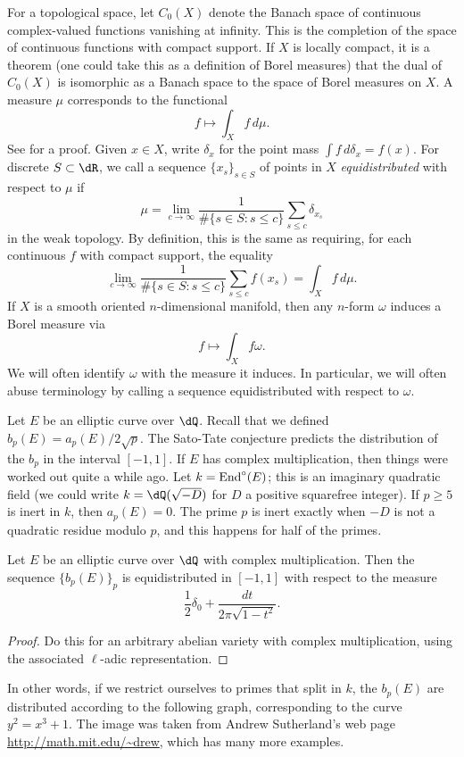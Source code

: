 For a topological space, let $C_0(X)$ denote the Banach space of continuous 
complex-valued functions vanishing at infinity. This is the completion of the 
space of continuous functions with compact support. If $X$ is locally compact, 
it is a theorem (one could take this as a definition of Borel measures) that 
the dual of $C_0(X)$ is isomorphic as a Banach space to the space of Borel 
measures on $X$. A measure $\mu$ corresponds to the functional 
\[
  f\mapsto  \int_X f\, d\mu \text{.}
\]
See \cite[6.19]{ru87} for a proof. Given $x\in X$, write $\delta_x$ for the 
point mass $\int f\,d\delta_x = f(x)$. For discrete $S\subset \dR$, we call a 
sequence $\{x_s\}_{s\in S}$ of points in $X$ \emph{equidistributed} with 
respect to $\mu$ if 
\[
  \mu = \lim_{c \to \infty} \frac{1}{\# \{s\in S:s\leqslant c\}} \sum_{s\leqslant c} \delta_{x_s} 
\]
in the weak topology. By definition, this is the same as requiring, for each 
continuous $f$ with compact support, the equality 
\[
   \lim_{c \to \infty} \frac{1}{\# \{s\in S:s\leqslant c\}} \sum_{s\leqslant c} f(x_s)  = \int_X f\, d\mu\text{.}
\]
If $X$ is a smooth oriented $n$-dimensional manifold, then any $n$-form 
$\omega$ induces a Borel measure via 
\[
  f\mapsto \int_X f\omega \text{.}
\]
We will often identify $\omega$ with the measure it induces. In particular, we 
will often abuse terminology by calling a sequence equidistributed with 
respect to $\omega$. 

Let $E$ be an elliptic curve over $\dQ$. Recall that we defined 
$b_p(E) = a_p(E) / 2\sqrt p$. The Sato-Tate conjecture predicts the 
distribution of the $b_p$ in the interval $[-1,1]$. If $E$ has complex 
multiplication, then things were worked out quite a while ago. Let 
$k=\operatorname{End}^\circ(E)$; this is an imaginary quadratic field (we could write 
$k=\dQ(\sqrt{-D})$ for $D$ a positive squarefree integer). If 
$p\geqslant 5$ is inert in $k$, then $a_p(E) = 0$. The prime $p$ is inert 
exactly when $-D$ is not a quadratic residue modulo $p$, and this happens 
for half of the primes. 

\begin{theorem}\label{thm:deuring-hecke}
Let $E$ be an elliptic curve over $\dQ$ with complex multiplication. Then the 
sequence $\{b_p(E)\}_p$ is equidistributed in $[-1,1]$ with respect to 
the  measure 
\[
  \frac 1 2 \delta_0 + \frac{dt}{2\pi \sqrt{1-t^2}} \text{.}
\]
\end{theorem}
\begin{proof}
Do this for an arbitrary abelian variety with complex multiplication, using the 
associated $\ell$-adic representation. 
\end{proof}
In other words, if we restrict ourselves to primes that split in $k$, the 
$b_p(E)$ are distributed according to the following graph, corresponding 
to the curve $y^2=x^3+1$. The image was taken from Andrew Sutherland's 
web page \url{http://math.mit.edu/~drew}, which has many more examples. 

